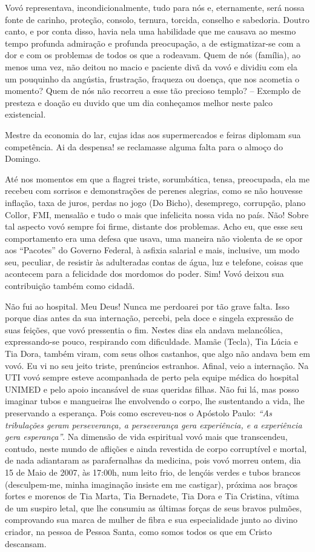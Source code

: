 \documentclass[
  brazil,
  a6paper,
  oneside,
  landscape,
  14pt]{scrbook}
\begin{document}
Vovó representava, incondicionalmente, tudo para nós e, eternamente,
será nossa fonte de carinho, proteção, consolo, ternura, torcida,
conselho e sabedoria. Doutro canto, e por conta disso, havia nela uma
habilidade que me causava ao mesmo tempo profunda admiração e profunda
preocupação, a de estigmatizar-se com a dor e com os problemas de todos
os que a rodeavam. Quem de nós (família), ao menos uma vez, não deitou
no macio e paciente divã da vovó e dividiu com ela um pouquinho da
angústia, frustração, fraqueza ou doença, que nos acometia o momento?
Quem de nós não recorreu a esse tão precioso templo? -- Exemplo de
presteza e doação eu duvido que um dia conheçamos melhor neste palco
existencial.

Mestre da economia do lar, cujas idas aos supermercados e feiras
diplomam sua competência. Ai da despensa! se reclamasse alguma falta
para o almoço do Domingo.

Até nos momentos em que a flagrei triste, sorumbática, tensa,
preocupada, ela me recebeu com sorrisos e demonstrações de perenes
alegrias, como se não houvesse inflação, taxa de juros, perdas no jogo
(Do Bicho), desemprego, corrupção, plano Collor, FMI, mensalão e tudo o
mais que infelicita nossa vida no país. Não! Sobre tal aspecto vovó
sempre foi firme, distante dos problemas. Acho eu, que esse seu
comportamento era uma defesa que usava, uma maneira não violenta de se
opor aos ``Pacotes'' do Governo Federal, à asfixia salarial e mais,
inclusive, um modo seu, peculiar, de resistir às adulteradas contas de
água, luz e telefone, coisas que acontecem para a felicidade dos
mordomos do poder. Sim! Vovó deixou sua contribuição também como cidadã.

Não fui ao hospital. Meu Deus! Nunca me perdoarei por tão grave falta.
Isso porque dias antes da sua internação, percebi, pela doce e singela
expressão de suas feições, que vovó pressentia o fim. Nestes dias ela
andava melancólica, expressando-se pouco, respirando com dificuldade.
Mamãe (Tecla), Tia Lúcia e Tia Dora, também viram, com seus olhos
castanhos, que algo não andava bem em vovó. Eu vi no seu jeito triste,
prenúncios estranhos. Afinal, veio a internação. Na UTI vovó sempre
esteve acompanhada de perto pela equipe médica do hospital UNIMED e pelo
apoio incansável de suas queridas filhas. Não fui lá, mas posso imaginar
tubos e mangueiras lhe envolvendo o corpo, lhe sustentando a vida, lhe
preservando a esperança. Pois como escreveu-nos o Apóstolo Paulo:
\emph{``As tribulações geram perseverança, a perseverança gera
experiência, e a experiência gera esperança''}. Na dimensão de vida
espiritual vovó mais que transcendeu, contudo, neste mundo de aflições e
ainda revestida de corpo corruptível e mortal, de nada adiantaram as
parafernalhas da medicina, pois vovó morreu ontem, dia 15 de Maio de
2007, às 17:00h, num leito frio, de lençóis verdes e tubos brancos
(desculpem-me, minha imaginação insiste em me castigar), próxima aos
braços fortes e morenos de Tia Marta, Tia Bernadete, Tia Dora e Tia
Cristina, vítima de um suspiro letal, que lhe consumiu as últimas forças
de seus bravos pulmões, comprovando sua marca de mulher de fibra e sua
especialidade junto ao divino criador, na pessoa de Pessoa Santa, como
somos todos os que em Cristo descansam.
\end{document}
